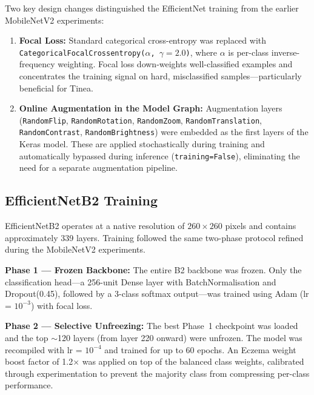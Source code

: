 Two key design changes distinguished the EfficientNet training from the earlier MobileNetV2 experiments:

\begin{enumerate}
    \item \textbf{Focal Loss:} Standard categorical cross-entropy was replaced with \texttt{CategoricalFocalCrossentropy($\alpha$, $\gamma=2.0$)}, where $\alpha$ is per-class inverse-frequency weighting. Focal loss down-weights well-classified examples and concentrates the training signal on hard, misclassified samples---particularly beneficial for Tinea.

    \item \textbf{Online Augmentation in the Model Graph:} Augmentation layers (\texttt{RandomFlip}, \texttt{RandomRotation}, \texttt{RandomZoom}, \texttt{RandomTranslation}, \texttt{RandomContrast}, \texttt{RandomBrightness}) were embedded as the first layers of the Keras model. These are applied stochastically during training and automatically bypassed during inference (\texttt{training=False}), eliminating the need for a separate augmentation pipeline.
\end{enumerate}


\subsection{EfficientNetB2 Training}
\label{sec:b2_training}

EfficientNetB2 operates at a native resolution of $260 \times 260$ pixels and contains approximately 339 layers. Training followed the same two-phase protocol refined during the MobileNetV2 experiments.

\textbf{Phase 1 --- Frozen Backbone:} The entire B2 backbone was frozen. Only the classification head---a 256-unit Dense layer with BatchNormalisation and Dropout(0.45), followed by a 3-class softmax output---was trained using Adam (lr = $10^{-3}$) with focal loss.

\textbf{Phase 2 --- Selective Unfreezing:} The best Phase~1 checkpoint was loaded and the top $\sim$120 layers (from layer 220 onward) were unfrozen. The model was recompiled with lr = $10^{-4}$ and trained for up to 60 epochs. An Eczema weight boost factor of 1.2$\times$ was applied on top of the balanced class weights, calibrated through experimentation to prevent the majority class from compressing per-class performance.

